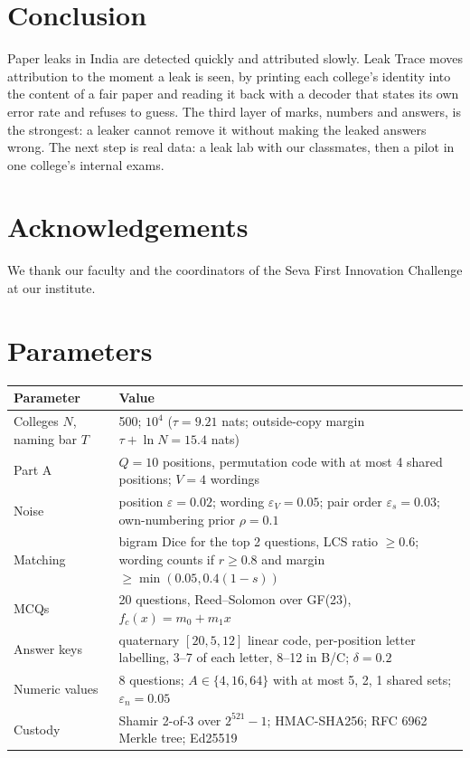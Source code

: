 \documentclass[10pt,a4paper]{article}
\theoremstyle{remark}
\newcommand{\tablefont}{\sffamily\footnotesize}
\begin{document}
\section{Conclusion}
Paper leaks in India are detected quickly and attributed slowly. Leak Trace moves attribution to the moment a leak is seen, by printing each college's identity into the content of a fair paper and reading it back with a decoder that states its own error rate and refuses to guess. The third layer of marks, numbers and answers, is the strongest: a leaker cannot remove it without making the leaked answers wrong. The next step is real data: a leak lab with our classmates, then a pilot in one college's internal exams.

\section*{Acknowledgements}
We thank our faculty and the coordinators of the Seva First Innovation Challenge at our institute.

\appendix
\section{Parameters}
\begin{table}[H]
\centering\tablefont
\begin{tabularx}{\linewidth}{@{}l Y@{}}
\toprule
Parameter & Value \\
\midrule
Colleges $N$, naming bar $T$ & 500; $10^4$ ($\tau=9.21$ nats; outside-copy margin $\tau+\ln N=15.4$ nats) \\
Part A & $Q=10$ positions, permutation code with at most 4 shared positions; $V=4$ wordings \\
Noise & position $\varepsilon=0.02$; wording $\varepsilon_V=0.05$; pair order $\varepsilon_s=0.03$; own-numbering prior $\rho=0.1$ \\
Matching & bigram Dice for the top 2 questions, LCS ratio $\ge0.6$; wording counts if $r\ge0.8$ and margin $\ge\min(0.05,0.4(1-s))$ \\
MCQs & 20 questions, Reed--Solomon over GF(23), $f_c(x)=m_0+m_1x$ \\
Answer keys & quaternary $[20,5,12]$ linear code, per-position letter labelling, 3--7 of each letter, 8--12 in B/C; $\delta=0.2$ \\
Numeric values & 8 questions; $A\in\{4,16,64\}$ with at most 5, 2, 1 shared sets; $\varepsilon_n=0.05$ \\
Custody & Shamir 2-of-3 over $2^{521}-1$; HMAC-SHA256; RFC 6962 Merkle tree; Ed25519 \\
\bottomrule
\end{tabularx}
\end{table}
\end{document}
